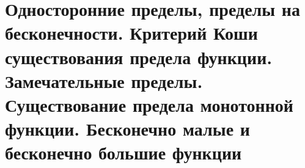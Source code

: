 \section{Односторонние пределы, пределы на бесконечности. Критерий Коши существования предела функции. Замечательные пределы. Существование предела монотонной функции. Бесконечно малые и бесконечно большие функции}